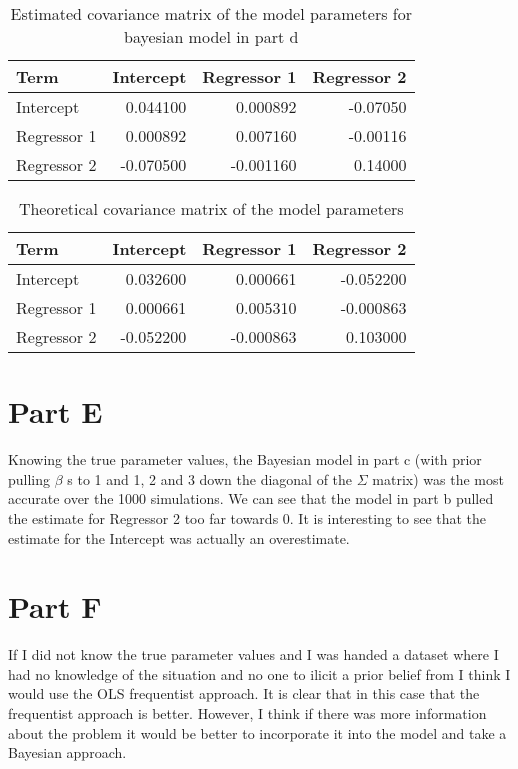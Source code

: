 \documentclass[]{book}
\begin{document}
\begin{table}

\caption{\label{tab:bayes-d-est-vcov-q3}Estimated covariance matrix of the model parameters for bayesian model in part d}
\centering
\begin{tabular}[t]{lrrr}
\toprule
Term & Intercept & Regressor 1 & Regressor 2\\
\midrule
Intercept & 0.044100 & 0.000892 & -0.07050\\
Regressor 1 & 0.000892 & 0.007160 & -0.00116\\
Regressor 2 & -0.070500 & -0.001160 & 0.14000\\
\bottomrule
\end{tabular}
\end{table}

\begin{table}

\caption{\label{tab:theory-vcov-d-q3}Theoretical covariance matrix of the model parameters}
\centering
\begin{tabular}[t]{lrrr}
\toprule
Term & Intercept & Regressor 1 & Regressor 2\\
\midrule
Intercept & 0.032600 & 0.000661 & -0.052200\\
Regressor 1 & 0.000661 & 0.005310 & -0.000863\\
Regressor 2 & -0.052200 & -0.000863 & 0.103000\\
\bottomrule
\end{tabular}
\end{table}

\hypertarget{part-e-1}{%
\section{Part E}\label{part-e-1}}

Knowing the true parameter values, the Bayesian model in part c (with prior pulling \(\beta\) s to 1 and 1, 2 and 3 down the diagonal of the \(\Sigma\) matrix) was the most accurate over the 1000 simulations. We can see that the model in part b pulled the estimate for Regressor 2 too far towards 0. It is interesting to see that the estimate for the Intercept was actually an overestimate.

\hypertarget{part-f-1}{%
\section{Part F}\label{part-f-1}}

If I did not know the true parameter values and I was handed a dataset where I had no knowledge of the situation and no one to ilicit a prior belief from I think I would use the OLS frequentist approach. It is clear that in this case that the frequentist approach is better. However, I think if there was more information about the problem it would be better to incorporate it into the model and take a Bayesian approach.
\end{document}
